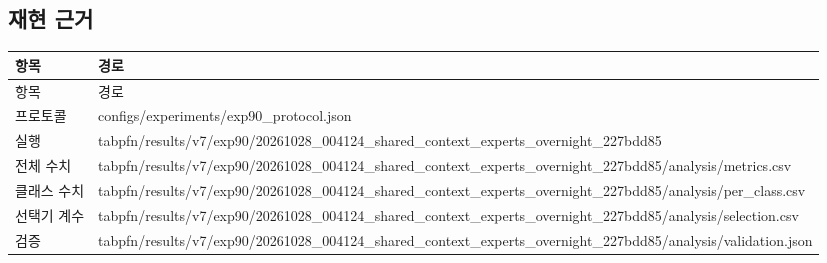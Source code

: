 \subsection{재현 근거}
\begingroup
\footnotesize
\begin{longtable}{>{\raggedright\arraybackslash}p{}>{\raggedright\arraybackslash}p{}}
\toprule
항목 & 경로 \\ \midrule
\endfirsthead
항목 & 경로 \\ \midrule
\endhead
{}프로토콜 & configs/\allowbreak{}experiments/\allowbreak{}exp90\_\allowbreak{}protocol.json \\
{}실행 & tabpfn/\allowbreak{}results/\allowbreak{}v7/\allowbreak{}exp90/\allowbreak{}20261028\_\allowbreak{}004124\_\allowbreak{}shared\_\allowbreak{}context\_\allowbreak{}experts\_\allowbreak{}overnight\_\allowbreak{}227bdd85 \\
{}전체 수치 & tabpfn/\allowbreak{}results/\allowbreak{}v7/\allowbreak{}exp90/\allowbreak{}20261028\_\allowbreak{}004124\_\allowbreak{}shared\_\allowbreak{}context\_\allowbreak{}experts\_\allowbreak{}overnight\_\allowbreak{}227bdd85/\allowbreak{}analysis/\allowbreak{}metrics.csv \\
{}클래스 수치 & tabpfn/\allowbreak{}results/\allowbreak{}v7/\allowbreak{}exp90/\allowbreak{}20261028\_\allowbreak{}004124\_\allowbreak{}shared\_\allowbreak{}context\_\allowbreak{}experts\_\allowbreak{}overnight\_\allowbreak{}227bdd85/\allowbreak{}analysis/\allowbreak{}per\_\allowbreak{}class.csv \\
{}선택기 계수 & tabpfn/\allowbreak{}results/\allowbreak{}v7/\allowbreak{}exp90/\allowbreak{}20261028\_\allowbreak{}004124\_\allowbreak{}shared\_\allowbreak{}context\_\allowbreak{}experts\_\allowbreak{}overnight\_\allowbreak{}227bdd85/\allowbreak{}analysis/\allowbreak{}selection.csv \\
{}검증 & tabpfn/\allowbreak{}results/\allowbreak{}v7/\allowbreak{}exp90/\allowbreak{}20261028\_\allowbreak{}004124\_\allowbreak{}shared\_\allowbreak{}context\_\allowbreak{}experts\_\allowbreak{}overnight\_\allowbreak{}227bdd85/\allowbreak{}analysis/\allowbreak{}validation.json \\
\bottomrule
\end{longtable}
\endgroup


